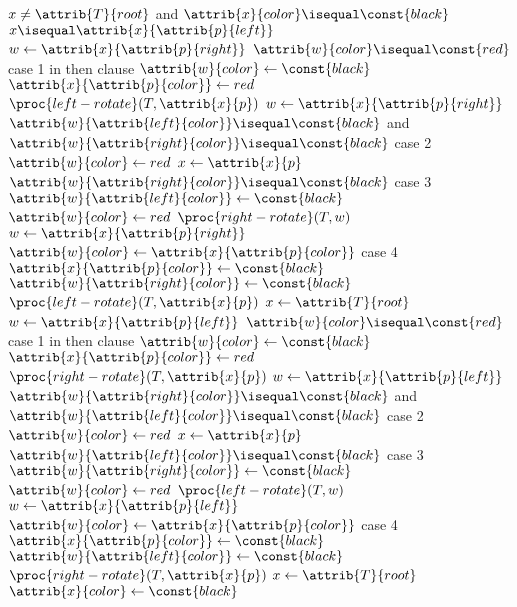 \documentclass[12pt]{article}
\begin{document}
\begin{codebox}
\li \While $x \neq \attrib{T}{root}$ and $\attrib{x}{color} \isequal \const{black}$
\li \Do
        \If $x \isequal \attrib{x}{\attrib{p}{left}}$
\li     \Then
            $w \gets{\attrib{x}{\attrib{p}{right}}}$
\li         \If $\attrib{w}{color} \isequal \const{red}$ \Comment case 1 in then clause
\li         \Then
                $\attrib{w}{color} \gets{\const{black}}$
\li             $\attrib{x}{\attrib{p}{color}} \gets{red }$
\li             $\proc{left-rotate}(T, \attrib{x}{p})$
\li             $w \gets{\attrib{x}{\attrib{p}{right}}}$
            \End
\li         \If $\attrib{w}{\attrib{left}{color}} \isequal \const{black}$ and $\attrib{w}{\attrib{right}{color}} \isequal \const{black}$ \Comment case 2
\li         \Then
                $\attrib{w}{color} \gets{red}$
\li             $x \gets{\attrib{x}{p}}$
\li         \Else
\li             \If $\attrib{w}{\attrib{right}{color}} \isequal \const{black}$ \Comment case 3
\li             \Then
                    $\attrib{w}{\attrib{left}{color}} \gets{\const{black}}$
\li                 $\attrib{w}{color} \gets{red}$
\li                 $\proc{right-rotate}(T, w)$
\li                 $w \gets{\attrib{x}{\attrib{p}{right}}}$
                \End
\li             $\attrib{w}{color} \gets{\attrib{x}{\attrib{p}{color}}}$ \Comment case 4
\li             $\attrib{x}{\attrib{p}{color}} \gets{\const{black}}$
\li             $\attrib{w}{\attrib{right}{color}} \gets{\const{black}}$
\li             $\proc{left-rotate}(T, \attrib{x}{p})$
\li             $x \gets{\attrib{T}{root}}$
            \End
\li     \Else
\li         $w \gets{\attrib{x}{\attrib{p}{left}}}$
\li         \If $\attrib{w}{color} \isequal \const{red}$ \Comment case 1 in then clause
\li         \Then
                $\attrib{w}{color} \gets{\const{black}}$
\li             $\attrib{x}{\attrib{p}{color}} \gets{red }$
\li             $\proc{right-rotate}(T, \attrib{x}{p})$
\li             $w \gets{\attrib{x}{\attrib{p}{left}}}$
            \End
\li         \If $\attrib{w}{\attrib{right}{color}} \isequal \const{black}$ and $\attrib{w}{\attrib{left}{color}} \isequal \const{black}$ \Comment case 2
\li         \Then
                $\attrib{w}{color} \gets{red}$
\li             $x \gets{\attrib{x}{p}}$
\li         \Else
\li             \If $\attrib{w}{\attrib{left}{color}} \isequal \const{black}$ \Comment case 3
\li             \Then
                    $\attrib{w}{\attrib{right}{color}} \gets{\const{black}}$
\li                 $\attrib{w}{color} \gets{red}$
\li                 $\proc{left-rotate}(T, w)$
\li                 $w \gets{\attrib{x}{\attrib{p}{left}}}$
                \End
\li             $\attrib{w}{color} \gets{\attrib{x}{\attrib{p}{color}}}$ \Comment case 4
\li             $\attrib{x}{\attrib{p}{color}} \gets{\const{black}}$
\li             $\attrib{w}{\attrib{left}{color}} \gets{\const{black}}$
\li             $\proc{right-rotate}(T, \attrib{x}{p})$
\li             $x \gets{\attrib{T}{root}}$
            \End
        \End
    \End
\li $\attrib{x}{color} \gets{\const{black}}$
\end{codebox}
\end{document}
